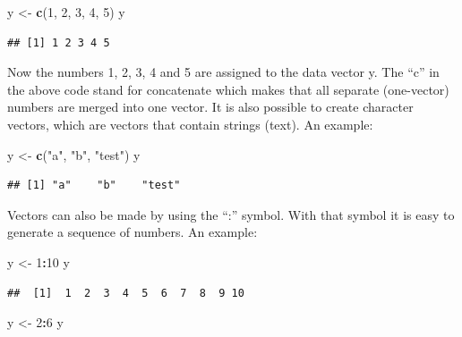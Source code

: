 \documentclass[]{book}
\newenvironment{Shaded}{\begin{snugshade}}{\end{snugshade}}
\newcommand{\KeywordTok}[1]{\textcolor[rgb]{0.13,0.29,0.53}{\textbf{#1}}}
\newcommand{\DecValTok}[1]{\textcolor[rgb]{0.00,0.00,0.81}{#1}}
\newcommand{\StringTok}[1]{\textcolor[rgb]{0.31,0.60,0.02}{#1}}
\newcommand{\OperatorTok}[1]{\textcolor[rgb]{0.81,0.36,0.00}{\textbf{#1}}}
\newcommand{\NormalTok}[1]{#1}
\begin{document}
\begin{Shaded}
\begin{Highlighting}[]
\NormalTok{y <-}\StringTok{ }\KeywordTok{c}\NormalTok{(}\DecValTok{1}\NormalTok{, }\DecValTok{2}\NormalTok{, }\DecValTok{3}\NormalTok{, }\DecValTok{4}\NormalTok{, }\DecValTok{5}\NormalTok{)}
\NormalTok{y}
\end{Highlighting}
\end{Shaded}

\begin{verbatim}
## [1] 1 2 3 4 5
\end{verbatim}

Now the numbers 1, 2, 3, 4 and 5 are assigned to the data vector y. The
``c'' in the above code stand for concatenate which makes that all
separate (one-vector) numbers are merged into one vector. It is also
possible to create character vectors, which are vectors that contain
strings (text). An example:

\begin{Shaded}
\begin{Highlighting}[]
\NormalTok{y <-}\StringTok{ }\KeywordTok{c}\NormalTok{(}\StringTok{"a"}\NormalTok{, }\StringTok{"b"}\NormalTok{, }\StringTok{"test"}\NormalTok{)}
\NormalTok{y}
\end{Highlighting}
\end{Shaded}

\begin{verbatim}
## [1] "a"    "b"    "test"
\end{verbatim}

Vectors can also be made by using the ``:'' symbol. With that symbol it
is easy to generate a sequence of numbers. An example:

\begin{Shaded}
\begin{Highlighting}[]
\NormalTok{y <-}\StringTok{ }\DecValTok{1}\OperatorTok{:}\DecValTok{10}
\NormalTok{y}
\end{Highlighting}
\end{Shaded}

\begin{verbatim}
##  [1]  1  2  3  4  5  6  7  8  9 10
\end{verbatim}

\begin{Shaded}
\begin{Highlighting}[]
\NormalTok{y <-}\StringTok{ }\DecValTok{2}\OperatorTok{:}\DecValTok{6}
\NormalTok{y}
\end{Highlighting}
\end{Shaded}
\end{document}
